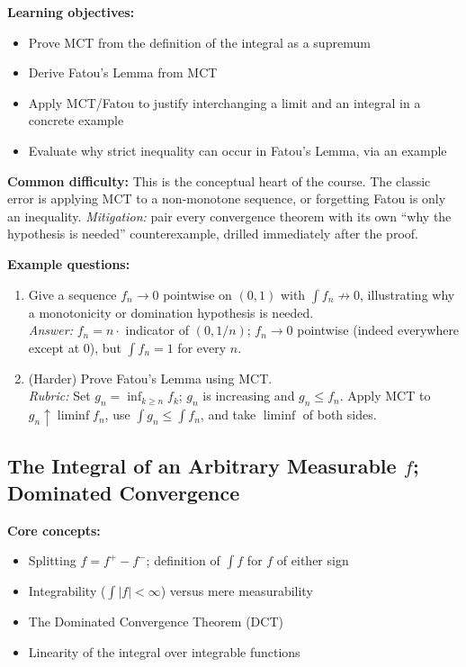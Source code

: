 \documentclass[11pt]{article}
\begin{document}
\textbf{Learning objectives:}
\begin{itemize}[nosep]
\item Prove MCT from the definition of the integral as a supremum
\item Derive Fatou's Lemma from MCT
\item Apply MCT/Fatou to justify interchanging a limit and an integral in a concrete example
\item Evaluate why strict inequality can occur in Fatou's Lemma, via an example
\end{itemize}

\textbf{Common difficulty:} This is the conceptual heart of the course. The classic error is applying MCT to a non-monotone sequence, or forgetting Fatou is only an inequality. \textit{Mitigation:} pair every convergence theorem with its own ``why the hypothesis is needed'' counterexample, drilled immediately after the proof.

\textbf{Example questions:}
\begin{enumerate}[nosep]
\item Give a sequence $f_n\to0$ pointwise on $(0,1)$ with $\int f_n\not\to0$, illustrating why a monotonicity or domination hypothesis is needed. \\
\textit{Answer:} $f_n=n\cdot$ indicator of $(0,1/n)$; $f_n\to0$ pointwise (indeed everywhere except at $0$), but $\int f_n=1$ for every $n$.
\item (Harder) Prove Fatou's Lemma using MCT. \\
\textit{Rubric:} Set $g_n=\inf_{k\ge n}f_k$; $g_n$ is increasing and $g_n\le f_n$. Apply MCT to $g_n\uparrow\liminf f_n$, use $\int g_n\le\int f_n$, and take $\liminf$ of both sides.
\end{enumerate}

\subsection{The Integral of an Arbitrary Measurable $f$; Dominated Convergence}

\textbf{Core concepts:}
\begin{itemize}[nosep]
\item Splitting $f=f^+-f^-$; definition of $\int f$ for $f$ of either sign
\item Integrability ($\int|f|<\infty$) versus mere measurability
\item The Dominated Convergence Theorem (DCT)
\item Linearity of the integral over integrable functions
\end{itemize}
\end{document}
